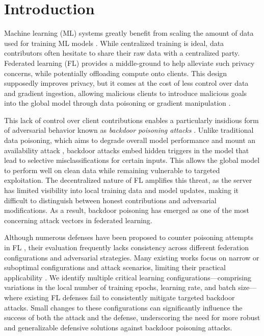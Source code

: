 \section{Introduction}
\label{sec:introduction}

Machine learning (ML) systems greatly benefit from scaling the amount of data used for training ML models \citep{Covert2024ScalingLF, Parthasarathi2019RealizingPS, fl_benefits, Wu2021SustainableAE}. While centralized training is ideal, data contributors often hesitate to share their raw data with a centralized party. Federated learning (FL) \citep{kairouz2021advances} provides a middle-ground to help alleviate such privacy concerns, while potentially offloading compute onto clients. This design supposedly improves privacy, but it comes at the cost of less control over data and gradient ingestion, allowing malicious clients to introduce malicious goals into the global model through data poisoning \citep{gu_badnets, Wang2024LinkageOS} or gradient manipulation \citep{bagdasaryan_howto, Goldblum2020DatasetSF}.

This lack of control over client contributions enables a particularly insidious form of adversarial behavior known as \textit{backdoor poisoning attacks} \citep{gu_badnets, liu2018trojaning, Alam2023GetRO, Zhang2024ConcealingBM, Chai2023ASF}. Unlike traditional data poisoning, which aims to degrade overall model performance and mount an availability attack \citep{rosenfeld2020certified, biggio2013poisoningattackssupportvector, fangbyzantinerobust, Tolpegin2020DataPA}, backdoor attacks embed hidden triggers in the model that lead to selective misclassifications for certain inputs. This allows the global model to perform well on clean data while remaining vulnerable to targeted exploitation. The decentralized nature of FL amplifies this threat, as the server has limited visibility into local training data and model updates, making it difficult to distinguish between honest contributions and adversarial modifications. As a result, backdoor poisoning has emerged as one of the most concerning attack vectors in federated learning.

Although numerous defenses have been proposed to counter poisoning attempts in FL \citep{yin2018byzantine, blanchard2017machine, cao2021fltrust, fung2018mitigating, auror, wang2022flare, nguyen2022flame, zhang2023flip, mesas}, their evaluation frequently lacks consistency across different federation configurations and adversarial strategies. Many existing works focus on narrow or suboptimal configurations and attack scenarios, limiting their practical applicability \citep{khan2023pitfalls}. We identify multiple critical learning configurations---comprising variations in the local number of training epochs, learning rate, and batch size---where existing FL defenses fail to consistently mitigate targeted backdoor attacks. Small changes to these configurations can significantly influence the success of both the attack and the defense, underscoring the need for more robust and generalizable defensive solutions against backdoor poisoning attacks.

